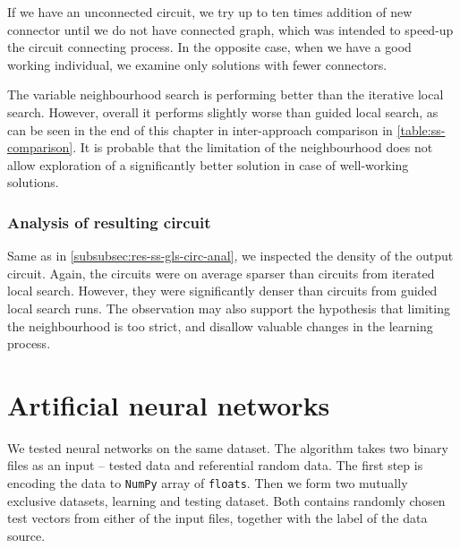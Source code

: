 \documentclass[
  print, %
  Table,   %
  nolof,     %
  nolot,     %
  11pt, %
  oneside  %
]{fithesis3}
\begin{document}
If we have an unconnected circuit, we try up to ten times addition of new connector until we do not have connected graph, which was intended to speed-up the circuit connecting process. In the opposite case, when we have a good working individual, we examine only solutions with fewer connectors.

The variable neighbourhood search is performing better than the iterative local search. However, overall it performs slightly worse than guided local search, as can be seen in the end of this chapter in inter-approach comparison in \cref{table:ss-comparison}. It is probable that the limitation of the neighbourhood does not allow exploration of a significantly better solution in case of well-working solutions.

\subsubsection{\textbf{Analysis of resulting circuit}}
\label{subsubsec:res-ss-vns-circ-anal}

Same as in \cref{subsubsec:res-ss-gls-circ-anal}, we inspected the density of the output circuit. Again, the circuits were on average sparser than circuits from iterated local search. However, they were significantly denser than circuits from guided local search runs. The observation may also support the hypothesis that limiting the neighbourhood is too strict, and disallow valuable changes in the learning process.


\section{Artificial neural networks}
\label{sec:res-ann}

We tested neural networks on the same dataset. The algorithm takes two binary files as an input -- tested data and referential random data. The first step is encoding the data to \texttt{NumPy} array of \texttt{floats}. Then we form two mutually exclusive datasets, learning and testing dataset. Both contains randomly chosen test vectors from either of the input files, together with the label of the data source.
\end{document}
